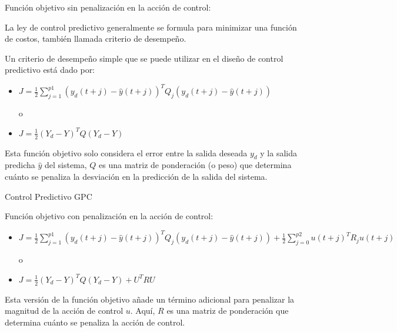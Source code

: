 \documentclass{beamer}
\begin{document}
\begin{frame}{Función objetivo sin penalización en la acción de control:}
\begin{justify}

La ley de control predictivo generalmente se formula para minimizar una función de costos, también llamada criterio de desempeño.

\vspace{0.3cm}
Un criterio de desempeño simple que se puede utilizar en el diseño de control predictivo está dado por:

\vspace{0.3cm}
\begin{itemize}
    \item \( J = \frac{1}{2} \sum_{j=1}^{p1} \left( y_d(t + j) - \hat{y}(t + j) \right)^T Q_j \left( y_d(t + j) - \hat{y}(t + j) \right) \)

    \vspace{0.3cm}
    o
    
    \vspace{0.3cm}
    \item \( J = \frac{1}{2} (Y_d - Y)^T Q (Y_d - Y) \)
\end{itemize}

\vspace{0.3cm}
Esta función objetivo solo considera el error entre la salida deseada \( y_d \) y la salida predicha \( \hat{y} \) del sistema, \( Q \) es una matriz de ponderación (o peso) que determina cuánto se penaliza la desviación en la predicción de la salida del sistema.

\end{justify}
\end{frame}

\begin{frame}{Control Predictivo GPC}
\begin{justify}

Función objetivo con penalización en la acción de control:

\vspace{0.3cm}
\begin{itemize}
    \item \( J = \frac{1}{2} \sum_{j=1}^{p1} \left( y_d(t + j) - \hat{y}(t + j) \right)^T Q_j \left( y_d(t + j) - \hat{y}(t + j) \right) + \frac{1}{2} \sum_{j=0}^{p2} u(t + j)^T R_j u(t + j) \)
    
    \vspace{0.3cm}
    o
    
    \vspace{0.3cm}
    \item \( J = \frac{1}{2} (Y_d - Y)^T Q (Y_d - Y) + U^T R U \)
\end{itemize}

\vspace{0.3cm}
Esta versión de la función objetivo añade un término adicional para penalizar la magnitud de la acción de control \( u \). Aquí, \( R \) es una matriz de ponderación que determina cuánto se penaliza la acción de control.


\end{justify}
\end{frame}
\end{document}
